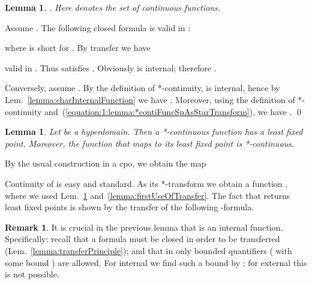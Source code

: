 \documentclass[envcountsect,orivec]{llncs} \pdfoutput=1
\newif\ifignore \ignorefalse
\newcommand{\auxproof}[1]{
\ifignore\mbox{}\newline
\textbf{BEGIN: AUX-PROOF} \dotfill\newline
{#1}\mbox{}\newline
\textbf{END: AUX-PROOF}\dotfill\newline
\fi}
\newtheorem{mylem}[mythm]{Lemma}
\theoremstyle{definition}
\newtheorem{myrem}[mythm]{Remark}
\def\myqed{\qed}
\begin{document}
\begin{mylem}\label{lemma:*contiFuncSpAsStarTransform}
 . Here
  denotes the set of continuous functions. 
\end{mylem}
\begin{myproof}
 Assume . The following closed formula is
 valid in :
 
 where  is short for
 . By
 transfer we have
 
 valid in . Thus  satisfies
 .  Obviously  is internal;
 therefore
 .

 Conversely, assume . By the
 definition of *-continuity,  is internal, hence by
 Lem.~\ref{lemma:charInternalFunction} we have .
 Moreover, using the definition of *-continuity and~(\ref{equation:1:lemma:*contiFuncSpAsStarTransform}), we have
 . \myqed
\end{myproof}

\begin{mylem}\label{lemma:fixedPtInHyperdomain}
 Let  be a hyperdomain. Then a
 *-continuous function 
 has a least
 fixed point. Moreover, the function  that maps  to its least fixed
 point  is *-continuous.
\auxproof{it is moreover described as the supremum
 .
}
\end{mylem}
\begin{myproof}
By the usual construction in a cpo, we obtain the map

Continuity of  is easy and standard.
As its *-transform
 we obtain a function
, where we used Lem.~\ref{lemma:*contiFuncSpAsStarTransform}
 and~\ref{lemma:firstUseOfTransfer}. 
The fact that  returns least fixed points is shown by the
 transfer
of the following -formula.
 
\auxproof{*** obsolete ***
 The  formula  below expresses the construction of  least
 fixed points in the cpo . It is closed and valid in .
 
 Thus its *-transform  is valid by transfer.  

By *-continuity, 
the given function 
  
is internal,  hence 
 (Lem.~\ref{lemma:charInternalFunction}); 
moreover it satisfies
 . The rest
 of the formula  states that  is the least
 fixed point of , and that it is the supremum of the internal
 hyperfunction , defined by
 
 (whose well-definedness is easily seen by transfer). \myqed
}
\end{myproof}

\begin{myrem}\label{remark:significanceOfInternal}
It is crucial  in the previous lemma that
  is an internal function. Specifically: recall that
 a formula  must be closed in order to be transferred
 (Lem.~\ref{lemma:transferPrinciple}); and that
in  only bounded quantifiers ( with some bound )
are allowed. For internal  we find such a bound by ; for external  this is not possible.

\end{myrem}
\end{document}
